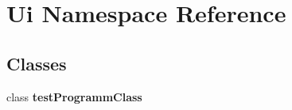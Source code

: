 \section{Ui Namespace Reference}
\label{namespace_ui}
\subsection*{Classes}
\begin{DoxyCompactItemize}
\item 
class {\bf testProgrammClass}
\end{DoxyCompactItemize}
